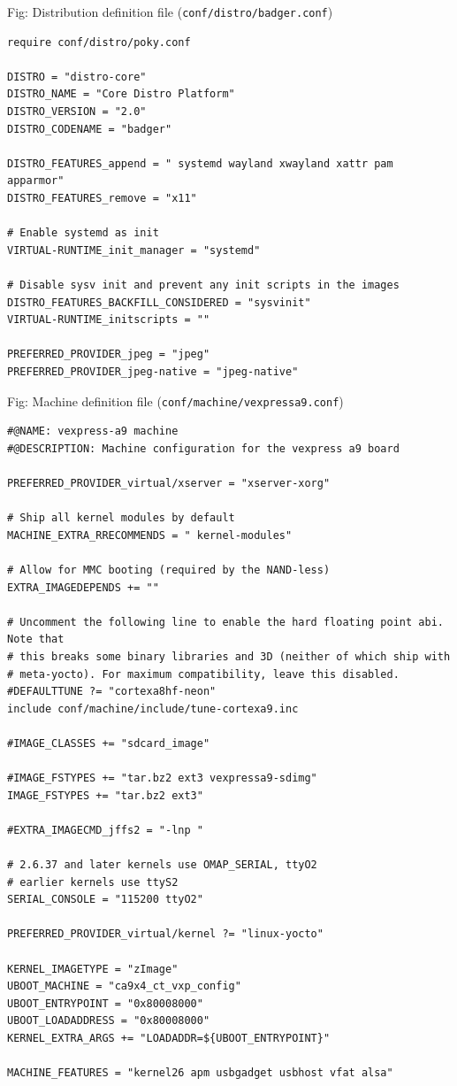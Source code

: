 \documentclass[10pt, a5paper]{article}
\begin{document}
Fig: Distribution definition file (\verb!conf/distro/badger.conf!)
\begin{lstlisting}
require conf/distro/poky.conf

DISTRO = "distro-core"
DISTRO_NAME = "Core Distro Platform"
DISTRO_VERSION = "2.0"
DISTRO_CODENAME = "badger"

DISTRO_FEATURES_append = " systemd wayland xwayland xattr pam apparmor"
DISTRO_FEATURES_remove = "x11"

# Enable systemd as init
VIRTUAL-RUNTIME_init_manager = "systemd"

# Disable sysv init and prevent any init scripts in the images
DISTRO_FEATURES_BACKFILL_CONSIDERED = "sysvinit"
VIRTUAL-RUNTIME_initscripts = ""

PREFERRED_PROVIDER_jpeg = "jpeg"
PREFERRED_PROVIDER_jpeg-native = "jpeg-native"
\end{lstlisting}

Fig: Machine definition file (\verb!conf/machine/vexpressa9.conf!)
\begin{lstlisting}
#@NAME: vexpress-a9 machine
#@DESCRIPTION: Machine configuration for the vexpress a9 board 

PREFERRED_PROVIDER_virtual/xserver = "xserver-xorg"

# Ship all kernel modules by default
MACHINE_EXTRA_RRECOMMENDS = " kernel-modules"

# Allow for MMC booting (required by the NAND-less)
EXTRA_IMAGEDEPENDS += ""

# Uncomment the following line to enable the hard floating point abi. Note that
# this breaks some binary libraries and 3D (neither of which ship with
# meta-yocto). For maximum compatibility, leave this disabled.
#DEFAULTTUNE ?= "cortexa8hf-neon"
include conf/machine/include/tune-cortexa9.inc

#IMAGE_CLASSES += "sdcard_image"

#IMAGE_FSTYPES += "tar.bz2 ext3 vexpressa9-sdimg"
IMAGE_FSTYPES += "tar.bz2 ext3"

#EXTRA_IMAGECMD_jffs2 = "-lnp "

# 2.6.37 and later kernels use OMAP_SERIAL, ttyO2
# earlier kernels use ttyS2
SERIAL_CONSOLE = "115200 ttyO2"

PREFERRED_PROVIDER_virtual/kernel ?= "linux-yocto"

KERNEL_IMAGETYPE = "zImage"
UBOOT_MACHINE = "ca9x4_ct_vxp_config"
UBOOT_ENTRYPOINT = "0x80008000"
UBOOT_LOADADDRESS = "0x80008000"
KERNEL_EXTRA_ARGS += "LOADADDR=${UBOOT_ENTRYPOINT}"

MACHINE_FEATURES = "kernel26 apm usbgadget usbhost vfat alsa"
\end{lstlisting}
\end{document}
